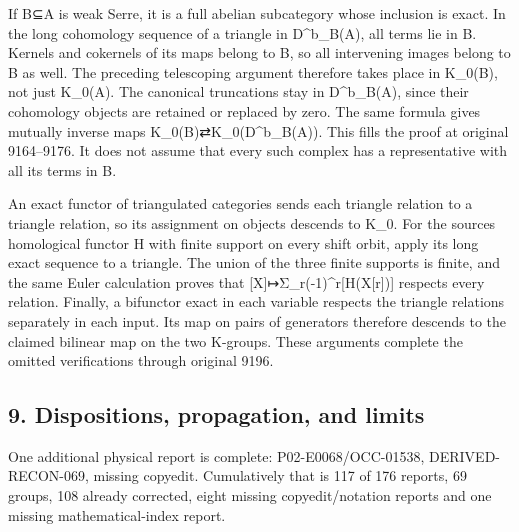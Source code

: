 \documentclass[11pt]{article}
\begin{document}
If B⊆A is weak Serre,\allowbreak{} it is a full abelian subcategory whose inclusion is exact. In the long cohomology sequence of a triangle in D\textasciicircum{}b\_\allowbreak{}B(A)\allowbreak{},\allowbreak{} all terms lie in B. Kernels and cokernels of its maps belong to B,\allowbreak{} so all intervening images belong to B as well. The preceding telescoping argument therefore takes place in K\_\allowbreak{}0(B)\allowbreak{},\allowbreak{} not just K\_\allowbreak{}0(A)\allowbreak{}. The canonical truncations stay in D\textasciicircum{}b\_\allowbreak{}B(A)\allowbreak{},\allowbreak{} since their cohomology objects are retained or replaced by zero. The same formula gives mutually inverse maps K\_\allowbreak{}0(B)\allowbreak{}⇄K\_\allowbreak{}0(D\textasciicircum{}b\_\allowbreak{}B(A)\allowbreak{})\allowbreak{}. This fills the proof at original 9164–\allowbreak{}9176. It does not assume that every such complex has a representative with all its terms in B.

An exact functor of triangulated categories sends each triangle relation to a triangle relation,\allowbreak{} so its assignment on objects descends to K\_\allowbreak{}0. For the source\textquotesingle s homological functor H with finite support on every shift orbit,\allowbreak{} apply its long exact sequence to a triangle. The union of the three finite supports is finite,\allowbreak{} and the same Euler calculation proves that [X]\allowbreak{}\allowbreak{}↦Σ\_\allowbreak{}r(-1)\allowbreak{}\textasciicircum{}r[H(X[r]\allowbreak{})\allowbreak{}]\allowbreak{} respects every relation. Finally,\allowbreak{} a bifunctor exact in each variable respects the triangle relations separately in each input. Its map on pairs of generators therefore descends to the claimed bilinear map on the two K-groups. These arguments complete the omitted verifications through original 9196.

\subsection{\texorpdfstring{9. Dispositions,\allowbreak{} propagation,\allowbreak{} and limits}{9.   and limits}}\label{proofs-8774-9196-dispositions-propagation-and-limits}

One additional physical report is complete:\allowbreak{} P02-E0068/\allowbreak{}OCC-01538,\allowbreak{} DERIVED-RECON-069,\allowbreak{} missing copyedit. Cumulatively that is 117 of 176 reports,\allowbreak{} 69 groups,\allowbreak{} 108 already corrected,\allowbreak{} eight missing copyedit/\allowbreak{}notation reports and one missing mathematical-index report.
\end{document}

